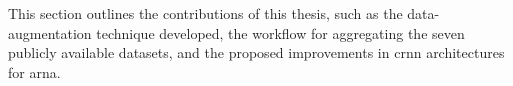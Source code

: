 

This section outlines the contributions of this thesis, such
as the data-augmentation technique developed, the workflow
for aggregating the seven publicly available datasets, and
the proposed improvements in \gls{crnn} architectures for
\gls{arna}.
